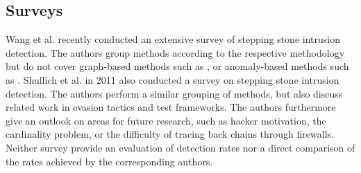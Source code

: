 \documentclass[runningheads,11pt]{llncs}\usepackage[]{graphicx}\usepackage[]{color}
\begin{document}

\subsection{Surveys}
Wang et al. \cite{wang2018research} recently conducted an extensive survey of stepping stone intrusion detection. The authors group methods according to the respective methodology 
but do not cover graph-based methods such as \cite{gamarra2018analysis}, %
or anomaly-based methods such as \cite{di2011detecting}.%
Shullich et al. \cite{shullich2011survey} in 2011 also conducted a survey on stepping stone intrusion detection. The authors perform a similar grouping of methods, but also discuss related work in evasion tactics and test frameworks. The authors furthermore give an outlook on areas for future research, such as hacker motivation, the cardinality problem, or the difficulty of tracing back chains through firewalls.%
Neither survey provide an evaluation of detection rates nor a direct comparison of the rates achieved by the corresponding authors. 

\end{document}
